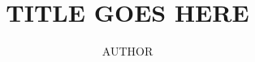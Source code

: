 \documentclass[11pt, twoside, mscthesisonly]{vuwthesis}
\theoremstyle{definition}
\begin{document}
    \let\temp\phi
    \let\phi\varphi
    \let\varphi\temp
    \vuwfrontmatter

    \title{TITLE GOES HERE}
    \author{AUTHOR}
    \subject{Mathematics}

    \maketitle

    

    

    \tableofcontents


    \vuwmainmatter


    
    
    


    \vuwbackmatter

    \printbibliography
\end{document}
